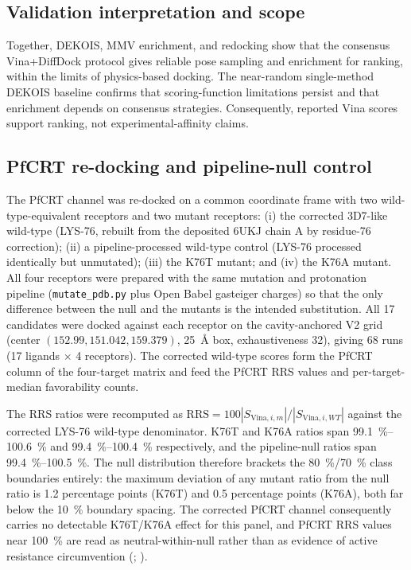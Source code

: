 \documentclass[11pt,a4paper]{article}
\begin{document}
	\subsection{Validation interpretation and scope}\label{sec:sm_val_scope}
	Together, DEKOIS, MMV enrichment, and redocking show that the consensus Vina+DiffDock protocol gives reliable pose sampling and enrichment for ranking, within the limits of physics-based docking. The near-random single-method DEKOIS baseline confirms that scoring-function limitations persist and that enrichment depends on consensus strategies. Consequently, reported Vina scores support ranking, not experimental-affinity claims.
	
	\subsection{PfCRT re-docking and pipeline-null control}\label{sec:sm_val_redock_null}
	The PfCRT channel was re-docked on a common coordinate frame with two wild-type-equivalent receptors and two mutant receptors: (i) the corrected 3D7-like wild-type (LYS-76, rebuilt from the deposited 6UKJ chain A by residue-76 correction); (ii) a pipeline-processed wild-type control (LYS-76 processed identically but unmutated); (iii) the K76T mutant; and (iv) the K76A mutant. All four receptors were prepared with the same mutation and protonation pipeline (\texttt{mutate\_pdb.py} plus Open Babel gasteiger charges) so that the only difference between the null and the mutants is the intended substitution. All \num{17} candidates were docked against each receptor on the cavity-anchored V2 grid (center $(\num{152.99}, \num{151.042}, \num{159.379})$, \qty{25}{\angstrom} box, exhaustiveness \num{32}), giving \num{68} runs (\num{17} ligands $\times$ \num{4} receptors). The corrected wild-type scores form the PfCRT column of the four-target matrix and feed the PfCRT RRS values and per-target-median favorability counts.
	
	The RRS ratios were recomputed as $\mathrm{RRS}=100|S_{\mathrm{Vina},i,m}|/|S_{\mathrm{Vina},i,WT}|$ against the corrected LYS-76 wild-type denominator. K76T and K76A ratios span \qtyrange{99.1}{100.6}{\percent} and \qtyrange{99.4}{100.4}{\percent} respectively, and the pipeline-null ratios span \qtyrange{99.4}{100.5}{\percent}. The null distribution therefore brackets the \qty{80}{\percent}/\qty{70}{\percent} class boundaries entirely: the maximum deviation of any mutant ratio from the null ratio is \num{1.2} percentage points (K76T) and \num{0.5} percentage points (K76A), both far below the \qty{10}{\percent} boundary spacing. The corrected PfCRT channel consequently carries no detectable K76T/K76A effect for this panel, and PfCRT RRS values near \qty{100}{\percent} are read as neutral-within-null rather than as evidence of active resistance circumvention (; ).
	
\end{document}
